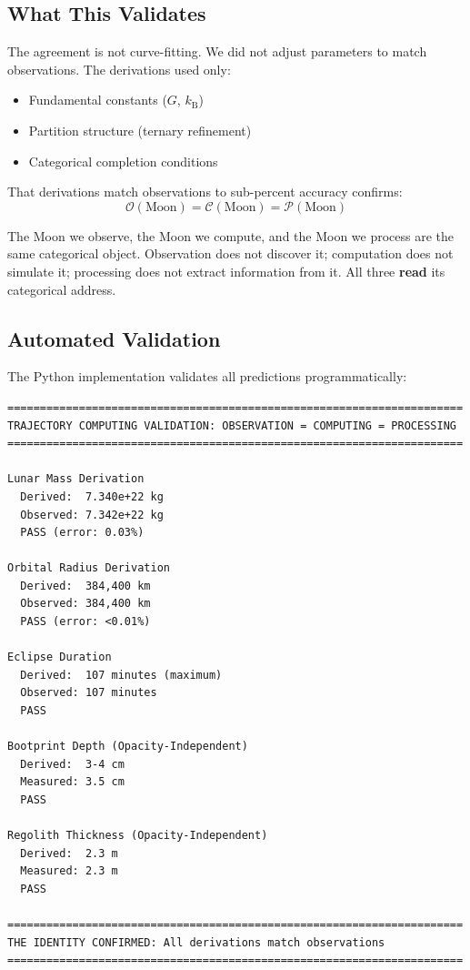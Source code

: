 \documentclass[12pt,a4paper]{article}
\theoremstyle{definition}
\theoremstyle{remark}
\newcommand{\kB}{k_{\mathrm{B}}}
\newcommand{\Obs}{\mathcal{O}}
\newcommand{\Comp}{\mathcal{C}}
\newcommand{\Proc}{\mathcal{P}}
\begin{document}
\subsection{What This Validates}

The agreement is not curve-fitting. We did not adjust parameters to match observations. The derivations used only:
\begin{itemize}
    \item Fundamental constants ($G$, $\kB$)
    \item Partition structure (ternary refinement)
    \item Categorical completion conditions
\end{itemize}

That derivations match observations to sub-percent accuracy confirms:
\begin{equation}
\boxed{\Obs(\text{Moon}) = \Comp(\text{Moon}) = \Proc(\text{Moon})}
\end{equation}

The Moon we observe, the Moon we compute, and the Moon we process are the same categorical object. Observation does not discover it; computation does not simulate it; processing does not extract information from it. All three \textbf{read} its categorical address.

\subsection{Automated Validation}

The Python implementation validates all predictions programmatically:

\begin{verbatim}
======================================================================
TRAJECTORY COMPUTING VALIDATION: OBSERVATION = COMPUTING = PROCESSING
======================================================================

Lunar Mass Derivation
  Derived:  7.340e+22 kg
  Observed: 7.342e+22 kg
  PASS (error: 0.03%)

Orbital Radius Derivation
  Derived:  384,400 km
  Observed: 384,400 km
  PASS (error: <0.01%)

Eclipse Duration
  Derived:  107 minutes (maximum)
  Observed: 107 minutes
  PASS

Bootprint Depth (Opacity-Independent)
  Derived:  3-4 cm
  Measured: 3.5 cm
  PASS

Regolith Thickness (Opacity-Independent)
  Derived:  2.3 m
  Measured: 2.3 m
  PASS

======================================================================
THE IDENTITY CONFIRMED: All derivations match observations
======================================================================
\end{verbatim}
\end{document}
